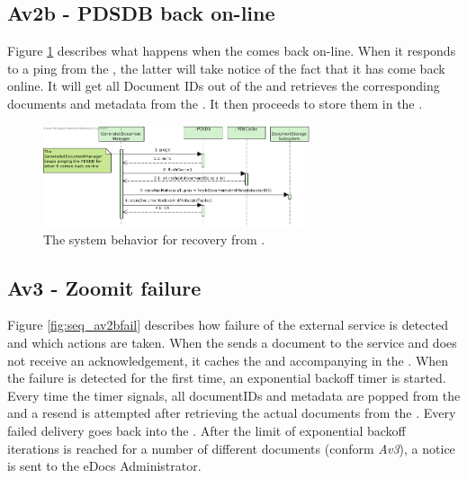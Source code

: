 \subsection{Av2b - PDSDB back on-line}
Figure \ref{fig:seq_av2bonline} describes what happens when the  comes back on-line. When it responds to a ping from the , the latter will take notice of the fact that it has come back online. It will get all Document IDs out of the  and retrieves the corresponding documents and metadata from the . It then proceeds to store them in the .

\begin{figure}[!htp]
    \centering
    \includegraphics[width=0.7\textwidth]{figures/Av2b - PDSDB back on-line.png}
    \caption{The system behavior for recovery from .
        }\label{fig:seq_av2bonline}
\end{figure}


\subsection{Av3 - Zoomit failure}
Figure \ref{fig:seq_av2bfail} describes how failure of the external  service is detected and which actions are taken. When the  sends a document to the  service and does not receive an acknowledgement, it caches the  and accompanying  in the . When the failure is detected for the first time, an exponential backoff timer is started. Every time the timer signals, all documentIDs and metadata are popped from the  and a resend is attempted after retrieving the actual documents from the . Every failed delivery goes back into the . After the limit of exponential backoff iterations is reached for a number of different documents (conform \emph{Av3}), a notice is sent to the eDocs Administrator.


